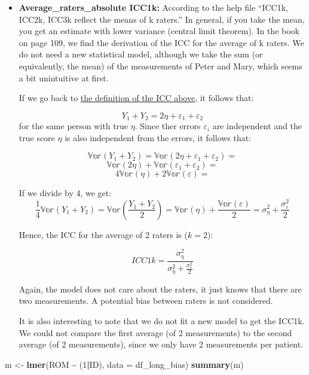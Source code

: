 \documentclass[
]{article}
\newenvironment{Shaded}{\begin{snugshade}}{\end{snugshade}}
\newcommand{\AttributeTok}[1]{\textcolor[rgb]{0.13,0.29,0.53}{#1}}
\newcommand{\DecValTok}[1]{\textcolor[rgb]{0.00,0.00,0.81}{#1}}
\newcommand{\FunctionTok}[1]{\textcolor[rgb]{0.13,0.29,0.53}{\textbf{#1}}}
\newcommand{\NormalTok}[1]{#1}
\newcommand{\OtherTok}[1]{\textcolor[rgb]{0.56,0.35,0.01}{#1}}
\newcommand{\SpecialCharTok}[1]{\textcolor[rgb]{0.81,0.36,0.00}{\textbf{#1}}}
\begin{document}
\begin{itemize}
\item
  \textbf{Average\_raters\_absolute ICC1k:}
  According to the help file ``ICC1k, ICC2k, ICC3k reflect the means of k raters.''
  In general, if you take the mean, you get an estimate with lower variance (central limit theorem).
  In the book on page 109, we find the derivation of the ICC for the average of k raters.
  We do not need a new statistical model, although we take the sum (or equivalently, the mean) of the
  measurements of Peter and Mary, which seems a bit unintuitive at first.

  If we go back to \hyperref[ICC]{the definition of the ICC above}, it follows that:

  \[Y_{1} + Y_{2} = 2 \eta + \varepsilon_1 + \varepsilon_2\]
  for the same person with true \(\eta\). Since ther errors \(\varepsilon_i\) are
  independent and the true score \(\eta\) is also independent from the errors,
  it follows that:

  \[\mathbb{Var}(Y_1 + Y_2) = \mathbb{Var}(2 \eta + \varepsilon_1 + \varepsilon_2)=\]
  \[ \mathbb{Var}(2 \eta) + \mathbb{Var}(\varepsilon_1 + \varepsilon_2)=\]
  \[4 \mathbb{Var}(\eta) + 2 \mathbb{Var}(\varepsilon)=\]

  If we divide by 4, we get:
  \[\frac{1}{4}\mathbb{Var}(Y_1 + Y_2) = \mathbb{Var}(\frac{Y_1 + Y_2}{2}) = 
  \mathbb{Var}(\eta) + \frac{\mathbb{Var}(\varepsilon)}{2} = 
  \sigma_{\eta}^2 + \frac{\sigma_{\varepsilon}^2}{2}\]

  Hence, the ICC for the average of 2 raters is (\(k=2\)):

  \[ICC1k = \frac{\sigma_{\eta}^2}{\sigma_{\eta}^2 + \frac{\sigma_{\varepsilon}^2}{2}}\]

  Again, the model does not care about the raters, it just knows that there are
  two measurements. A potential bias between raters is not considered.

  It is also interesting to note that we do not fit a new model to get the ICC1k.
  We could not compare the first average (of 2 measurements) to the second average
  (of 2 measurements), since we only have 2 measurements per patient.
\end{itemize}

\begin{Shaded}
\begin{Highlighting}[]
\NormalTok{m }\OtherTok{\textless{}{-}} \FunctionTok{lmer}\NormalTok{(ROM }\SpecialCharTok{\textasciitilde{}}\NormalTok{ (}\DecValTok{1}\SpecialCharTok{|}\NormalTok{ID), }\AttributeTok{data =}\NormalTok{ df\_long\_bias)}
\FunctionTok{summary}\NormalTok{(m)}
\end{Highlighting}
\end{Shaded}
\end{document}
